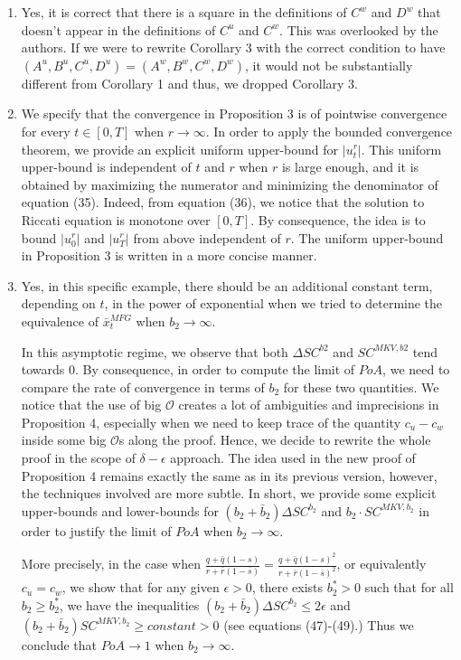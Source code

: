 \documentclass[]{article}
\begin{document}
\begin{enumerate}
	\item Yes, it is correct that there is a square in the definitions of $C^w$ and $D^w$ that doesn't appear in the definitions of $C^u$ and $C^w$. This was overlooked by the authors. If we were to rewrite Corollary 3 with the correct condition to have $(A^u,B^u,C^u,D^u)=(A^w,B^w,C^w,D^w)$, it would not be substantially different from Corollary 1 and thus, we dropped Corollary 3.
	
	\item We specify that the convergence in Proposition 3 is of pointwise convergence for every $t \in [0,T]$ when $r \to \infty$. In order to apply the bounded convergence theorem, we provide an explicit uniform upper-bound for $\vert u_t^{r} \vert $. This uniform upper-bound is independent of $t$ and $r$ when $r$ is large enough, and it is obtained by maximizing the numerator and minimizing the denominator of equation (35). Indeed, from equation (36), we notice that the solution to Riccati equation is monotone over $[0,T]$. By consequence, the idea is to bound $\vert u_0^r \vert$ and $\vert u_T^r \vert$ from above independent of $r$. The uniform upper-bound in Proposition 3 is written in a more concise manner.
	
	\item Yes, in this specific example, there should be an additional constant term, depending on $t$, in the power of exponential when we tried to determine the equivalence of $\bar{x}_t^{MFG}$ when $b_2 \to \infty$.
	
	In this asymptotic regime, we observe that both $\Delta SC^{b2}$ and $SC^{MKV,b2}$ tend towards $0$. By consequence, in order to compute the limit of $PoA$, we need to compare the rate of convergence in terms of $b_2$ for these two quantities. We notice that the use of big $\mathcal{O}$ creates a lot of ambiguities and imprecisions in Proposition 4, especially when we need to keep trace of the quantity $c_u -c_w$ inside some big $\mathcal{O}$s along the proof. Hence, we decide to rewrite the whole proof in the scope of $\delta-\epsilon$ approach. The idea used in the new proof of Proposition 4 remains exactly the same as in its previous version, however, the techniques involved are more subtle. In short, we provide some explicit upper-bounds and lower-bounds for $(b_2 + \bar{b}_2) \Delta SC^{b_2}$ and $b_2 \cdot SC^{MKV,b_2}$ in order to justify the limit of $PoA$ when $b_2 \to \infty$.
	
	More precisely, in the case when $\frac{q + \bar{q}(1-s)}{r + \bar{r}(1-\bar{s}) } = \frac{q + \bar{q}(1-s)^2}{r + \bar{r}(1-\bar{s})^2}$, or equivalently $c_u = c_w$, we show that for any given $\epsilon > 0$, there exists $b_2^*>0$ such that for all $b_2 \geq b_2^{*}$, we have the inequalities $(b_2 + \bar{b}_2) \Delta SC^{b_2} \leq 2\epsilon$ and 
	$(b_2 + \bar{b}_2) SC^{MKV,b_2} \geq constant > 0$ (see equations (47)-(49).) Thus we conclude that $PoA \to 1$ when $b_2 \to \infty$.
		

\end{enumerate}
\end{document}
